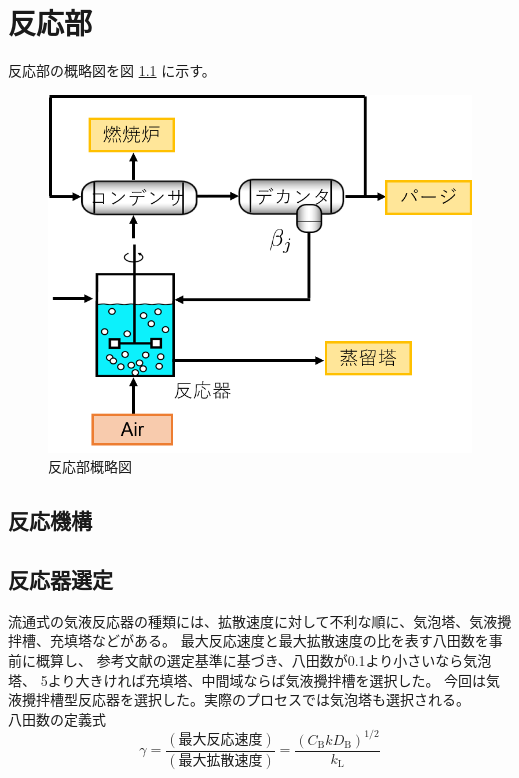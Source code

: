 \documentclass[a4j]{jsreport}
\begin{document}
\newpage
\chapter{反応部}

反応部の概略図を図 \ref{反応部設計結果の概略図} に示す。
\begin{figure}[h]
    \label{反応部設計結果の概略図}
    \begin{center}
        \includegraphics[scale=0.7]{ReactionSection.png}
        \caption{反応部概略図}
    \end{center}
\end{figure}

\section{反応機構}

\section{反応器選定}
流通式の気液反応器の種類には、拡散速度に対して不利な順に、気泡塔、気液攪拌槽、充填塔などがある。
最大反応速度と最大拡散速度の比を表す八田数を事前に概算し、
参考文献\cite{化工便覧}の選定基準に基づき、八田数が0.1より小さいなら気泡塔、
5より大きければ充填塔、中間域ならば気液攪拌槽を選択した。
今回は気液攪拌槽型反応器を選択した。実際のプロセスでは気泡塔も選択される。\\
八田数の定義式
\begin{equation}
    \gamma = \frac{(\text{最大反応速度})}{(\text{最大拡散速度})} = \frac{(C_{\mathrm{ B}}kD_{\mathrm{ B}})^{1/2}}{k_{\mathrm{ L}}}
\end{equation}
\end{document}
